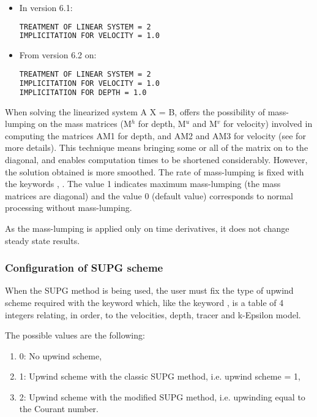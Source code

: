 \begin{itemize}
\item  In version 6.1:
\begin{lstlisting}[language=bash]
TREATMENT OF LINEAR SYSTEM = 2 
IMPLICITATION FOR VELOCITY = 1.0
\end{lstlisting}
\item  From version 6.2 on:
\begin{lstlisting}[language=bash]
TREATMENT OF LINEAR SYSTEM = 2 
IMPLICITATION FOR VELOCITY = 1.0 
IMPLICITATION FOR DEPTH = 1.0
\end{lstlisting}
\end{itemize}

  When solving the linearized system A X = B,  offers the possibility of mass-lumping on the mass matrices (M${}^{h}$ for depth, M${}^{u}$ and M${}^{v}$ for velocity) involved in computing the matrices AM1 for depth, and AM2 and AM3 for velocity (see \cite{Hervouet2007} for more details). This technique means bringing some or all of the matrix on to the diagonal, and enables computation times to be shortened considerably. However, the solution obtained is more smoothed. The rate of mass-lumping is fixed with the keywords , . The value 1 indicates maximum mass-lumping (the mass matrices are diagonal) and the value 0 (default value) corresponds to normal processing without mass-lumping.

 As the mass-lumping is applied only on time derivatives, it does not change steady state results.
\subsubsection{  Configuration of SUPG scheme}

 When the SUPG method is being used, the user must fix the type of upwind scheme required with the keyword  which, like the keyword , is a table of 4 integers relating, in order, to the velocities, depth, tracer and k-Epsilon model.

 The possible values are the following:

\begin{enumerate}
\item[\nonumber]   0: No upwind scheme,

\item [\nonumber]  1: Upwind scheme with the classic SUPG method, i.e. upwind scheme = 1,

\item[\nonumber]   2: Upwind scheme with the modified SUPG method, i.e. upwinding equal to the Courant number.
\end{enumerate}

